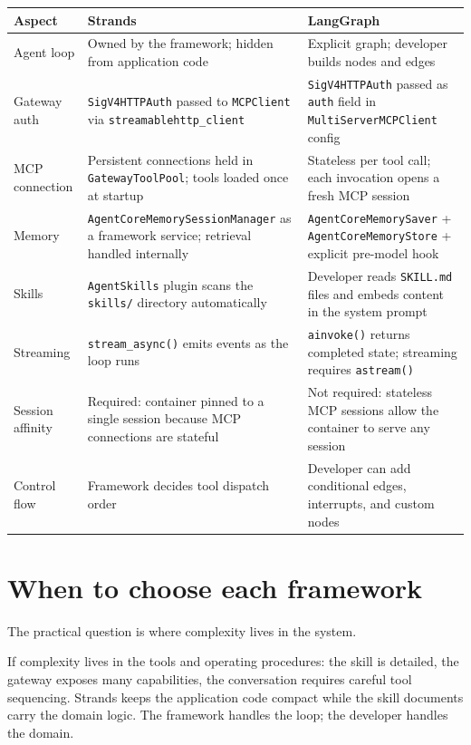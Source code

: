 \begin{longtable}{p{}p{}p{}}
\toprule
\textbf{Aspect} & \textbf{Strands} & \textbf{LangGraph} \\
\midrule
Agent loop
    & Owned by the framework; hidden from application code
    & Explicit graph; developer builds nodes and edges \\
\addlinespace
Gateway auth
    & \texttt{SigV4HTTPAuth} passed to \texttt{MCPClient}
      via \texttt{streamablehttp\_client}
    & \texttt{SigV4HTTPAuth} passed as \texttt{auth} field
      in \texttt{MultiServerMCPClient} config \\
\addlinespace
MCP connection
    & Persistent connections held in \texttt{GatewayToolPool};
      tools loaded once at startup
    & Stateless per tool call; each invocation opens a fresh
      MCP session \\
\addlinespace
Memory
    & \texttt{AgentCoreMemorySessionManager} as a framework
      service; retrieval handled internally
    & \texttt{AgentCoreMemorySaver} +
      \texttt{AgentCoreMemoryStore} + explicit pre-model hook \\
\addlinespace
Skills
    & \texttt{AgentSkills} plugin scans the \texttt{skills/}
      directory automatically
    & Developer reads \texttt{SKILL.md} files and embeds
      content in the system prompt \\
\addlinespace
Streaming
    & \texttt{stream\_async()} emits events as the loop runs
    & \texttt{ainvoke()} returns completed state; streaming
      requires \texttt{astream()} \\
\addlinespace
Session affinity
    & Required: container pinned to a single session because
      MCP connections are stateful
    & Not required: stateless MCP sessions allow the container
      to serve any session \\
\addlinespace
Control flow
    & Framework decides tool dispatch order
    & Developer can add conditional edges, interrupts,
      and custom nodes \\
\bottomrule
\end{longtable}

\section{When to choose each framework}

The practical question is where complexity lives in the system.

If complexity lives in the tools and operating procedures: the skill is detailed, the
gateway exposes many capabilities, the conversation requires careful tool
sequencing. Strands keeps the application code compact while the skill documents carry
the domain logic. The framework handles the loop; the developer handles the domain.

